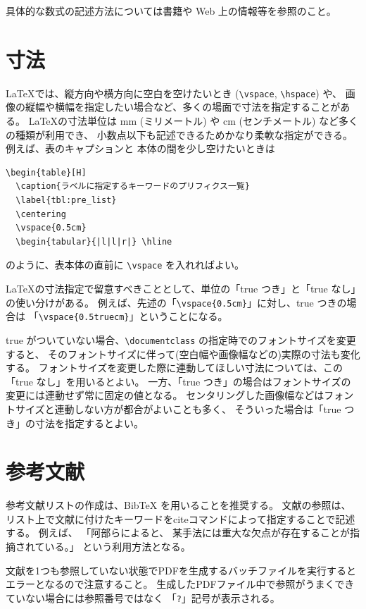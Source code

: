 具体的な数式の記述方法については書籍や Web 上の情報等を参照のこと。

\section{寸法}

\LaTeX では、縦方向や横方向に空白を空けたいとき (\verb+\vspace+, \verb+\hspace+) や、
画像の縦幅や横幅を指定したい場合など、多くの場面で寸法を指定することがある。
\LaTeX の寸法単位は mm (ミリメートル) や cm (センチメートル) など多くの種類が利用でき、
小数点以下も記述できるためかなり柔軟な指定ができる。例えば、表のキャプションと
本体の間を少し空けたいときは
\begin{verbatim}
\begin{table}[H]
  \caption{ラベルに指定するキーワードのプリフィクス一覧}
  \label{tbl:pre_list}
  \centering
  \vspace{0.5cm}
  \begin{tabular}{|l|l|r|} \hline
\end{verbatim}
のように、表本体の直前に \verb+\vspace+ を入れればよい。

\LaTeX の寸法指定で留意すべきこととして、単位の「true つき」と「true なし」の使い分けがある。
例えば、先述の「\verb+\vspace{0.5cm}+」に対し、true つきの場合は
「\verb+\vspace{0.5truecm}+」ということになる。

true がついていない場合、\verb+\documentclass+ の指定時でのフォントサイズを変更すると、
そのフォントサイズに伴って(空白幅や画像幅などの)実際の寸法も変化する。
フォントサイズを変更した際に連動してほしい寸法については、この「true なし」を用いるとよい。
一方、「true つき」の場合はフォントサイズの変更には連動せず常に固定の値となる。
センタリングした画像幅などはフォントサイズと連動しない方が都合がよいことも多く、
そういった場合は「true つき」の寸法を指定するとよい。

\section{参考文献}
\label{sec:bib}

参考文献リストの作成は、BibTeX を用いることを推奨する。
文献の参照は、リスト上で文献に付けたキーワードをciteコマンドによって指定することで記述する。
例えば、
「阿部ら\cite{abeJ}によると、
某手法\cite{nowrouzezahrai}には重大な欠点が存在することが指摘されている。」
という利用方法となる。

文献を1つも参照していない状態でPDFを生成するバッチファイルを実行するとエラーとなるので注意すること。
生成したPDFファイル中で参照がうまくできていない場合には参照番号ではなく
「\verb+?+」記号が表示される。

